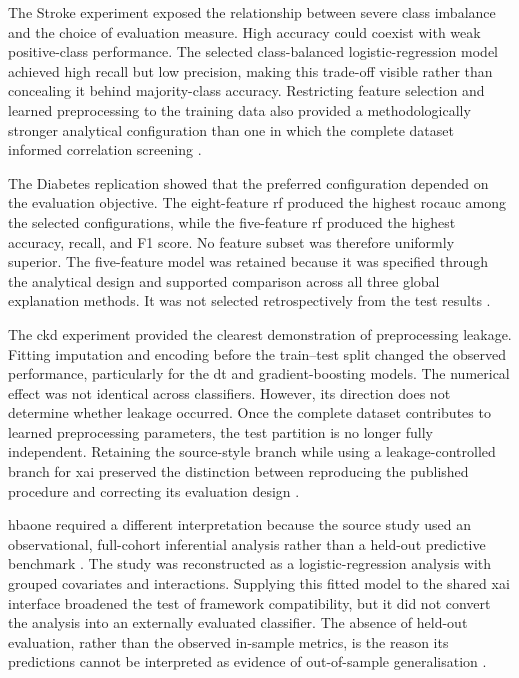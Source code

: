 The Stroke experiment exposed the relationship between severe class imbalance and the choice of evaluation measure. High accuracy could coexist with weak positive-class performance. The selected class-balanced logistic-regression model achieved high recall but low precision, making this trade-off visible rather than concealing it behind majority-class accuracy. Restricting feature selection and learned preprocessing to the training data also provided a methodologically stronger analytical configuration than one in which the complete dataset informed correlation screening \citep{wu_machine_2024}.

The Diabetes replication showed that the preferred configuration depended on the evaluation objective. The eight-feature \gls{rf} produced the highest \gls{rocauc} among the selected configurations, while the five-feature \gls{rf} produced the highest accuracy, recall, and F1 score. No feature subset was therefore uniformly superior. The five-feature model was retained because it was specified through the analytical design and supported comparison across all three global explanation methods. It was not selected retrospectively from the test results \citep{chang_pima_2023}.

The \gls{ckd} experiment provided the clearest demonstration of preprocessing leakage. Fitting imputation and encoding before the train--test split changed the observed performance, particularly for the \gls{dt} and gradient-boosting models. The numerical effect was not identical across classifiers. However, its direction does not determine whether leakage occurred. Once the complete dataset contributes to learned preprocessing parameters, the test partition is no longer fully independent. Retaining the source-style branch while using a leakage-controlled branch for \gls{xai} preserved the distinction between reproducing the published procedure and correcting its evaluation design \citep{santhiya_chronic_2024}.

\gls{hbaone} required a different interpretation because the source study used an observational, full-cohort inferential analysis rather than a held-out predictive benchmark \citep{strack_impact_2014}. The study was reconstructed as a logistic-regression analysis with grouped covariates and interactions. Supplying this fitted model to the shared \gls{xai} interface broadened the test of framework compatibility, but it did not convert the analysis into an externally evaluated classifier. The absence of held-out evaluation, rather than the observed in-sample metrics, is the reason its predictions cannot be interpreted as evidence of out-of-sample generalisation \citep{collins_tripodai_2024, moons_probastai_2025}.

